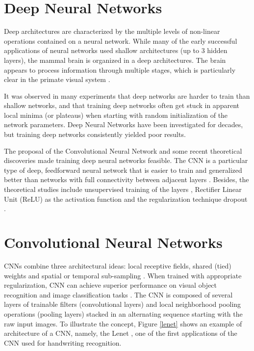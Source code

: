 
\section{Deep Neural Networks}
Deep architectures are characterized by the multiple levels of non-linear operations
contained on a neural network. While many of the early successful applications of neural networks used shallow architectures (up to 3 hidden layers), the mammal brain is organized in a deep architectures. The brain appears to process information through multiple stages, which is particularly clear in the primate visual system \cite{bengio2009learning}. 

It was observed in many experiments that deep networks are harder to train than shallow networks, and that training deep networks often get stuck in apparent local minima (or plateaus) when starting with random initialization of the network parameters. Deep Neural Networks have been investigated for decades, but training deep networks consistently yielded poor results. 

The proposal of the Convolutional Neural Network \cite{lecun1995convolutional} and some recent theoretical discoveries made training deep neural networks feasible. The CNN is a particular type of deep, feedforward neural network that is easier to train and generalized better than networks with full connectivity between adjacent layers \cite{lecun2015deep}. Besides, the theoretical studies include unsupervised training of the layers \cite{hinton2006fast}, Rectifier Linear Unit (ReLU) \cite{nair2010rectified} as the activation function and the regularization technique dropout \cite{srivastava2014dropout}. 


\section{Convolutional Neural Networks}
CNNs combine three architectural ideas: local receptive fields, shared
(tied) weights and spatial or temporal sub-sampling \cite{lecun1998gradient}. When trained with appropriate regularization, CNN can achieve superior performance
on visual object recognition and image classification tasks \cite{lecun2015deep}. The CNN is composed of several layers of trainable filters (convolutional layers) and local neighborhood pooling operations (pooling layers) stacked in an alternating sequence starting with the raw input images. To illustrate the concept, Figure \ref{lenet} shows an example of architecture of a CNN, namely, the Lenet \cite{lecun1998gradient}, one of the first applications of the CNN used for handwriting recognition.

